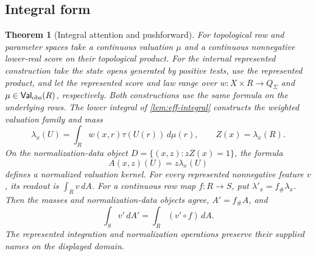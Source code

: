 \documentclass[11pt,a4paper]{article}
\newtheorem{theorem}{Theorem}[section]
\theoremstyle{definition}
\theoremstyle{remark}\newaliascnt{remark}{theorem}
\numberwithin{equation}{section}
\begin{document}
\subsection{Integral form}
\begin{theorem}[Integral attention and pushforward]
\label{thm:refine-integral-attention}
For topological row and parameter spaces take a continuous valuation $\mu$ and a continuous nonnegative lower-real score on their topological product. For the internal represented construction take the state opens generated by positive tests, use the represented product, and let the represented score and law range over $w:X\times R\to Q_\Sigma$ and $\mu\in\mathsf{Val}_{\rm obs}(R)$, respectively. Both constructions use the same formula on the underlying rows.
The lower integral of \cref{lem:eff-integral} constructs the weighted valuation
family and mass
\[
 \lambda_x(U)=\int_Rw(x,r)\tau(U(r))\,d\mu(r),\qquad
 Z(x)=\lambda_x(R).
\]
On the normalization-data object
$D=\{(x,z):zZ(x)=1\}$, the formula
\[
 A(x,z)(U)=z\lambda_x(U)
\]
defines a normalized valuation kernel. For every represented
nonnegative feature $v$, its readout is $\int_R v\,dA$.
For a continuous row map $f:R\to S$, put
$\lambda'_x=f_\#\lambda_x$. Then the masses and normalization-data
objects agree, $A'=f_\#A$, and
\[
 \int_S v'\,dA'=\int_R(v'\circ f)\,dA.
\]
The represented integration and normalization operations preserve their supplied names on the displayed domain.
\end{theorem}
\end{document}
